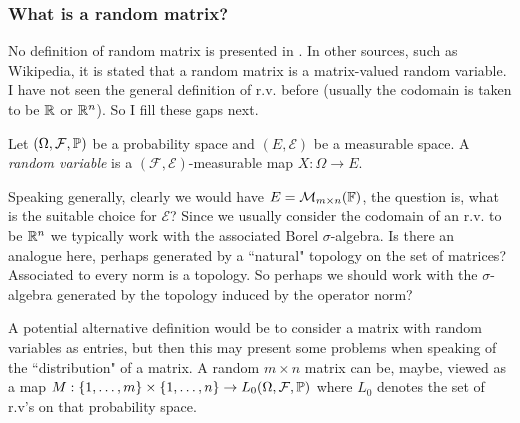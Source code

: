 \subsubsection{What is a random matrix?}
\begin{note}
No definition of random matrix is presented in \cite{bougerol2012products}. In other sources, such as Wikipedia, it is stated that a random matrix is a matrix-valued random variable. I have not seen the general definition of r.v. before (usually the codomain is taken to be $\mathbb{R}$ or $\mathbb{R}^n$). So I fill these gaps next.
\end{note}
\begin{definition}
Let $(\Omega, \mathcal{F}, \mathbb{P})$ be a probability space and $(E, \mathcal{E})$ be a measurable space. A \textit{random variable} is a $(\mathcal{F}, \mathcal{E})$-measurable map $X : \Omega \to E$.
\end{definition}

\begin{note}
	Speaking generally, clearly we would have $E = \mathcal{M}_{m \times n} (\mathbb{F})$, the question is, what is the suitable choice for $\mathcal{E}$? Since we usually consider the codomain of an r.v. to be $\mathbb{R}^n$ we typically work with the associated Borel $\sigma$-algebra. Is there an analogue here, perhaps generated by a ``natural" topology on the set of matrices? Associated to every norm is a topology. So perhaps we should work with the $\sigma$-algebra generated by the topology induced by the operator norm?
\end{note}

\begin{note}
		A potential alternative definition would be to consider a matrix with random variables as entries, but then this may present some problems when speaking of the ``distribution" of a matrix. A random $m \times n$ matrix can be, maybe, viewed as a map $M : \{1, \ldots, m\} \times \{1, \ldots, n\} \to L_0(\Omega, \mathcal{F},\mathbb{P})$ where $L_0$ denotes the set of r.v's on that probability space.
\end{note}